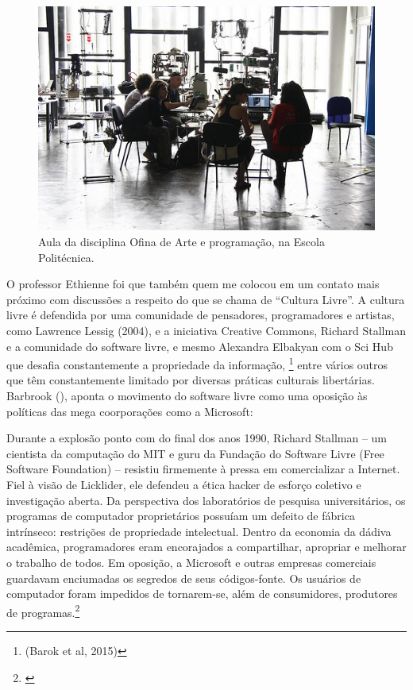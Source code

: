 \begin{figure}

\includegraphics[width=1\textwidth]{pictures/cap1/eti2}
\caption{Aula da disciplina Ofina de Arte e programação, na Escola Politécnica.}
\label{fig:eti2}
\end{figure}

O professor Ethienne foi que também quem me colocou em um contato mais próximo com discussões a respeito do que se chama de ``Cultura Livre''. A cultura livre é defendida por uma comunidade de pensadores, programadores e artistas, como Lawrence Lessig (2004), e a iniciativa Creative Commons, Richard Stallman e a comunidade do software livre, e mesmo Alexandra Elbakyan com o Sci Hub que desafia constantemente a propriedade da informação, \footnote{(Barok et al, 2015)} entre vários outros que têm constantemente limitado por diversas práticas culturais libertárias. Barbrook (\citeyear{Barbrook2009}), aponta o movimento do software livre como uma oposição às políticas das mega coorporações como a Microsoft:

\begin{citacao}
Durante a explosão ponto com do final dos anos 1990, Richard Stallman – um cientista da computação do MIT e guru da Fundação do Software Livre (Free Software Foundation) – resistiu firmemente à pressa em comercializar a Internet. Fiel à visão de Licklider, ele defendeu a ética hacker de esforço coletivo e investigação aberta. Da perspectiva dos laboratórios de pesquisa universitários, os programas de computador proprietários possuíam um defeito de fábrica intrínseco: restrições de propriedade intelectual. Dentro da economia da dádiva acadêmica, programadores eram encorajados a compartilhar, apropriar e melhorar o trabalho de todos. Em oposição, a Microsoft e outras empresas comerciais guardavam enciumadas os segredos de seus códigos-fonte. Os usuários de computador foram impedidos de tornarem-se, além de consumidores, produtores de programas.\footnote{\cite[367]{Barbrook2009}}
\end{citacao}

